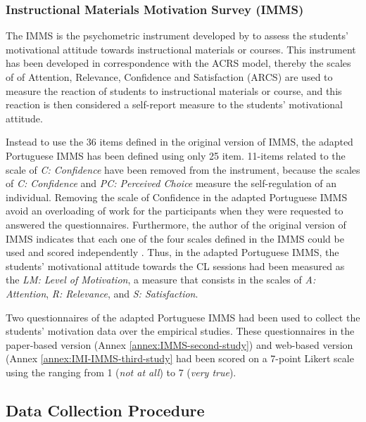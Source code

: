 \subsubsection*{Instructional Materials Motivation Survey (IMMS)}

The IMMS is the psychometric instrument developed by  to assess the students' motivational attitude towards instructional materials or courses. This instrument has been developed in correspondence with the ACRS model, thereby the scales of of Attention, Relevance, Confidence and Satisfaction (ARCS) are used to measure the reaction of students to instructional materials or course, and this reaction is then considered a self-report measure to the students' motivational attitude.

Instead to use the 36 items defined in the original version of IMMS, the adapted Portuguese IMMS has been defined using only 25 item. 11-items related to the scale of \emph{C: Confidence} have been removed from the instrument, because the scales of \emph{C: Confidence} and \emph{PC: Perceived Choice} measure the self-regulation of an individual. Removing the scale of Confidence in the adapted Portuguese IMMS avoid an overloading of work for the participants when they were requested to answered the questionnaires. Furthermore, the author of the original version of IMMS indicates that each one of the four scales defined in the IMMS could be used and scored independently \cite{Keller2009}. Thus, in the adapted Portuguese IMMS, the students' motivational attitude towards the CL sessions had been measured as the \emph{LM: Level of Motivation}, a measure that consists in the scales of \emph{A: Attention}, \emph{R: Relevance}, and \emph{S: Satisfaction}. 

Two questionnaires of the adapted Portuguese IMMS had been used to collect the students' motivation data over the empirical studies. These questionnaires in the paper-based version (Annex \ref{annex:IMMS-second-study}) and web-based version (Annex \ref{annex:IMI-IMMS-third-study} had been scored on a 7-point Likert scale using the ranging from 1 (\emph{not at all}) to 7 (\emph{very true}).

\subsection{Data Collection Procedure}


